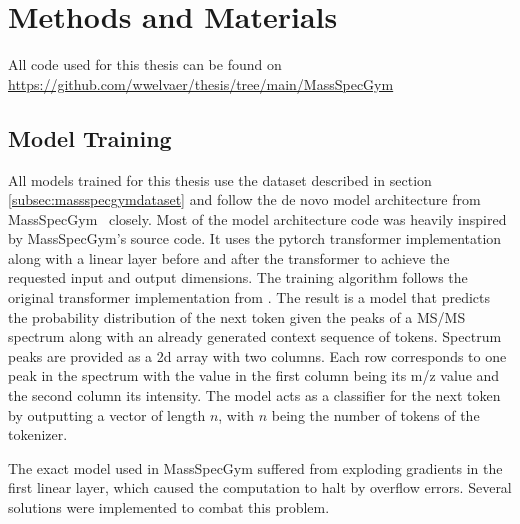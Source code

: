 \chapter{Methods and Materials}
\label{chap:methods}

All code used for this thesis can be found on \url{https://github.com/wwelvaer/thesis/tree/main/MassSpecGym}

\section{Model Training}
\label{sec:training}

All models trained for this thesis use the dataset described in section \ref{subsec:massspecgymdataset} and follow the de novo model architecture from MassSpecGym~\cite{bushuiev2024massspecgym} closely.
Most of the model architecture code was heavily inspired by MassSpecGym's source code.
It uses the pytorch transformer implementation along with a linear layer before and after the transformer to achieve the requested input and output dimensions.
The training algorithm follows the original transformer implementation from \textcite{vaswani2017attention}.
The result is a model that predicts the probability distribution of the next token given the peaks of a \ac{MS/MS} spectrum along with an already generated context sequence of tokens.
Spectrum peaks are provided as a 2d array with two columns. Each row corresponds to one peak in the spectrum with the value in the first column being its m/z value and the second column its intensity.
The model acts as a classifier for the next token by outputting a vector of length $n$, with $n$ being the number of tokens of the tokenizer.

The exact model used in MassSpecGym suffered from exploding gradients in the first linear layer, which caused the computation to halt by overflow errors.
Several solutions were implemented to combat this problem.

